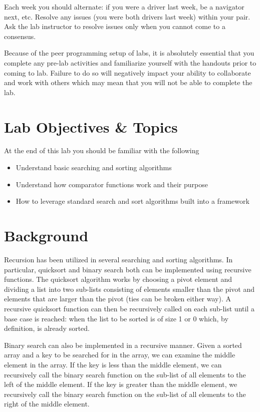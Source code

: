 \documentclass[12pt]{scrartcl}
\begin{document}
Each week you should alternate: if you were a driver last week, 
be a navigator next, etc.  Resolve any issues (you were both drivers
last week) within your pair.  Ask the lab instructor to resolve issues
only when you cannot come to a consensus.  

Because of the peer programming setup of labs, it is absolutely 
essential that you complete any pre-lab activities and familiarize
yourself with the handouts prior to coming to lab.  Failure to do
so will negatively impact your ability to collaborate and work with 
others which may mean that you will not be able to complete the
lab.  

\section{Lab Objectives \& Topics}
At the end of this lab you should be familiar with the following
\begin{itemize}
  \item Understand basic searching and sorting algorithms
  \item Understand how comparator functions work and their purpose
  \item How to leverage standard search and sort algorithms built into a framework
\end{itemize}

\section{Background}

Recursion has been utilized in several searching and sorting 
algorithms. In particular, quicksort and binary search both can 
be implemented using recursive functions.  The quicksort 
algorithm works by choosing a pivot element and dividing a 
list into two sub-lists consisting of elements smaller than the 
pivot and elements that are larger than the pivot (ties can be 
broken either way).  A recursive quicksort function can then 
be recursively called on each sub-list until a base case is 
reached: when the list to be sorted is of size 1 or 0 which, 
by definition, is already sorted.

Binary search can also be implemented in a recursive manner.  
Given a sorted array and a key to be searched for in the array, 
we can examine the middle element in the array.  If the key is 
less than the middle element, we can recursively call the binary 
search function on the sub-list of all elements to the left of the 
middle element.  If the key is greater than the middle element, 
we recursively call the binary search function on the sub-list of 
all elements to the right of the middle element.
\end{document}
